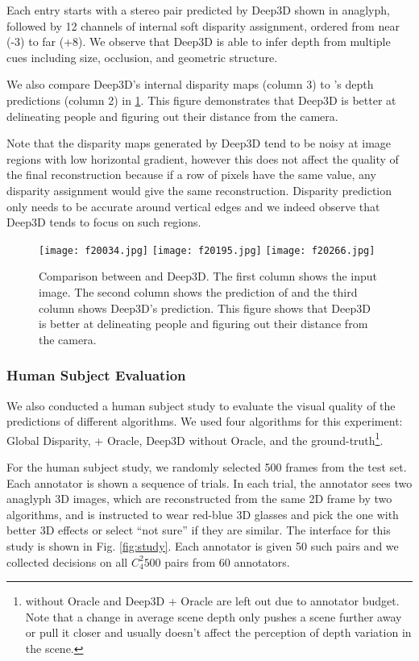 \documentclass[runningheads]{llncs}
\begin{document}
Each entry starts with a stereo pair predicted by Deep3D shown in anaglyph, followed by 12 channels of internal soft disparity assignment, ordered from near (-3) to far (+8).
We observe that Deep3D is able to infer depth from multiple cues including size, occlusion, and geometric structure.

We also compare Deep3D's internal disparity maps (column 3) to \cite{eigen2014depth}'s depth predictions (column 2) in \ref{fig:comp}.
This figure demonstrates that Deep3D is better at delineating people and figuring out their distance from the camera.

Note that the disparity maps generated by Deep3D tend to be noisy at image regions with low horizontal gradient, however this does not affect the quality of the final reconstruction because if a row of pixels have the same value, any disparity assignment would give the same reconstruction.
Disparity prediction only needs to be accurate around vertical edges and we indeed observe that Deep3D tends to focus on such regions.

\begin{figure}[t]
\texttt{[image: f20034.jpg]}
\texttt{[image: f20195.jpg]}
\texttt{[image: f20266.jpg]}
\caption{Comparison between \cite{eigen2014depth} and Deep3D. The first column shows the input image. The second column shows the prediction of \cite{eigen2014depth} and the third column shows Deep3D's prediction. This figure shows that Deep3D is better at delineating people and figuring out their distance from the camera.}
\label{fig:comp}
\end{figure}\subsubsection{Human Subject Evaluation}We also conducted a human subject study to evaluate the visual quality of the predictions of different algorithms.
We used four algorithms for this experiment: Global Disparity, \cite{eigen2014depth} + Oracle, Deep3D without Oracle, and the ground-truth\footnote{
\cite{eigen2014depth} without Oracle and Deep3D + Oracle are left out due to annotator budget.
Note that a change in average scene depth only pushes a scene further away or pull it closer and usually doesn't affect the perception of depth variation in the scene.}.

For the human subject study, we randomly selected 500 frames from the test set.
Each annotator is shown a sequence of trials.
In each trial, the annotator sees two anaglyph 3D images, which are reconstructed from the same 2D frame by two algorithms, and is instructed to wear red-blue 3D glasses and pick the one with better 3D effects or select ``not sure'' if they are similar.
The interface for this study is shown in Fig. \ref{fig:study}.
Each annotator is given 50 such pairs and we collected decisions on all $C_4^2 500$ pairs from 60 annotators.
\end{document}
